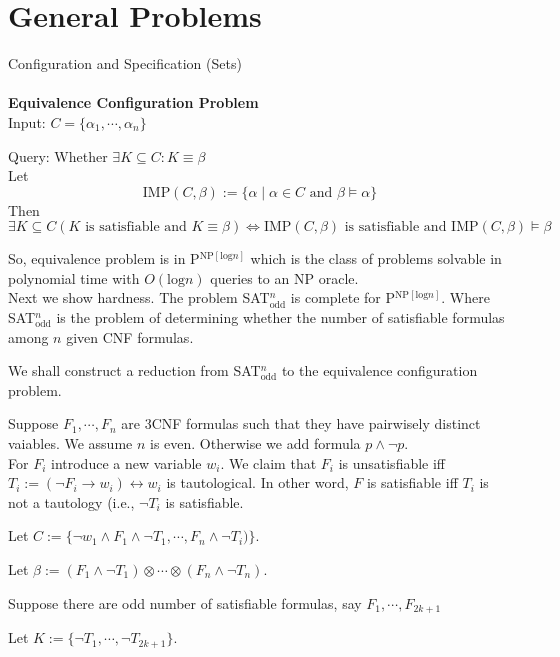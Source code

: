 \documentclass[12pt]{article}
\begin{document}
\section{General Problems}


Configuration and Specification (Sets)\\ \ \\

{\bf Equivalence Configuration Problem}\\

Input: $C=\{\alpha_1,\cdots,\alpha_n\}$

Query: Whether $\exists K\subseteq C: K\equiv \beta$\\

Let
$$\mbox{IMP}(C,\beta):=\{\alpha\mid \alpha\in C \mbox{ and }\beta\models \alpha\}$$
Then
$$\exists K\subseteq  C(K \text{ is satisfiable and } K\equiv \beta)\Longleftrightarrow\mbox{IMP}(C,\beta) \text{ is satisfiable and IMP}(C,\beta)\models \beta$$

So, equivalence problem is in P$^{\text{NP}[\text{log} n]}$ which is the class of problems solvable in polynomial time with $O(\text{log}n)$ queries to an NP oracle.\\

Next we show hardness. The problem SAT$^n_{\text{odd}}$ is complete for P$^{\text{NP}[\text{log} n]}$. Where SAT$^n_{\text{odd}}$ is the problem of determining whether the number of satisfiable formulas among $n$ given CNF formulas.

We shall construct a reduction from SAT$^n_{\text{odd}}$ to the equivalence configuration problem. 

Suppose $F_1,\cdots, F_n$ are 3CNF formulas such that they have pairwisely distinct vaiables. We assume $n$ is even. Otherwise we add formula $p\wedge \neg p$. \\

For $F_i$ introduce a new variable $w_i$. We claim that $F_i$ is unsatisfiable iff $T_i:=(\neg F_i\rightarrow w_i)\leftrightarrow w_i$ is tautological. In other word, $F$ is satisfiable iff $T_i$ is not a tautology (i.e., $\neg T_i$ is satisfiable. 

Let $C:=\{\neg w_1\wedge F_1\wedge \neg T_1,\cdots, F_n\wedge\neg T_i)\}$.

Let $\beta:=(F_1\wedge \neg T_1)\otimes\cdots \otimes (F_n\wedge \neg T_n)$.
 

Suppose there are odd number of satisfiable formulas, say $F_1,\cdots, F_{2k+1}$

Let $K:=\{\neg T_1,\cdots, \neg T_{2k+1}\}$. 
\end{document}
